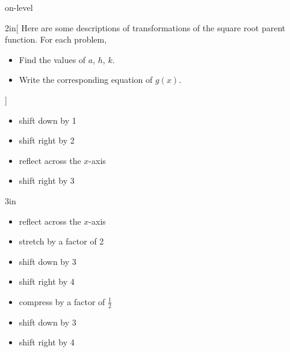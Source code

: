 \begin{taggedblock}{on-level}
\begin{my2Problems}[\normalsize]{2in}[%
    Here are some descriptions of transformations of the square root parent function.
    For each problem, 
    \vspace{-1em}
    \begin{itemize}[nosep]
        \item Find the values of $a$, $h$, $k$. 
        \item Write the corresponding equation of $g(x)$.
    \end{itemize}
    ]
    {
        \begin{itemize}[nosep]
            \item shift down by 1
            \item shift right by 2
        \end{itemize}
    }
    {
        \begin{itemize}[nosep]
            \item reflect across the $x$-axis
            \item shift right by 3
        \end{itemize}
    }
\end{my2Problems}
\begin{my2Problems}[\normalsize]{3in}
    {
        \begin{itemize}[nosep]
            \item reflect across the $x$-axis
            \item stretch by a factor of 2
            \item shift down by 3
            \item shift right by 4
        \end{itemize}
    }
    {
        \begin{itemize}[nosep]
            \item compress by a factor of $\frac{1}{2}$
            \item shift down by 3
            \item shift right by 4
        \end{itemize}
    }
\end{my2Problems}


\end{taggedblock}

